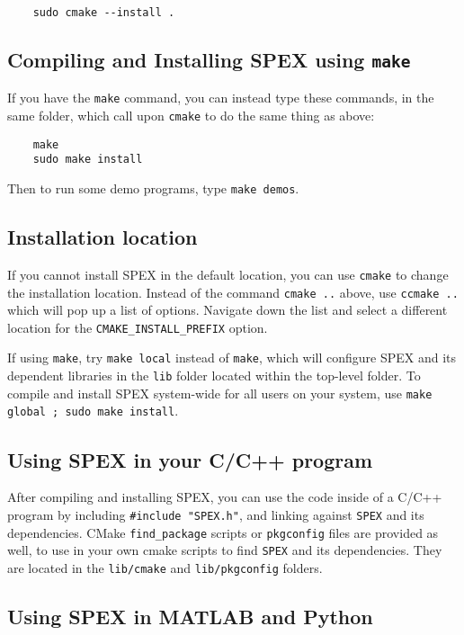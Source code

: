 \documentclass[12pt,oneside]{book}
\theoremstyle{definition}
\begin{document}
\begin{verbatim}
    sudo cmake --install .
\end{verbatim}

\subsection{Compiling and Installing SPEX using {\tt make}}

If you have the \verb'make' command, you can instead type these commands, in the same
folder, which call upon \verb'cmake' to do the same thing as above:

\begin{verbatim}
    make
    sudo make install 
\end{verbatim}

Then to run some demo programs, type \verb'make demos'.

\subsection{Installation location}

If you cannot install SPEX in the default location, you can use \verb'cmake'
to change the installation location.  Instead of the command \verb'cmake ..' above,
use \verb'ccmake ..' which will pop up a list of options.  Navigate down the list and 
select a different location for the \verb'CMAKE_INSTALL_PREFIX' option.

If using \verb'make', try \verb'make local' instead of \verb'make', which will configure
SPEX and its dependent libraries in the \verb'lib' folder located within the top-level
folder.  To compile and install SPEX system-wide for all users on your system, use \verb'make global ; sudo make install'.

\subsection{Using SPEX in your C/C++ program}

After compiling and installing SPEX,  you can
use the code inside of a C/C++ program by including  \verb|#include "SPEX.h"|,
and linking against \verb|SPEX| and its dependencies.  CMake \verb'find_package' scripts or
\verb'pkgconfig' files are provided as well, to use in your own cmake scripts to find
\verb|SPEX| and its dependencies.  They are located in the \verb'lib/cmake' and
\verb'lib/pkgconfig' folders.

\subsection{Using SPEX in MATLAB and Python}
\end{document}
